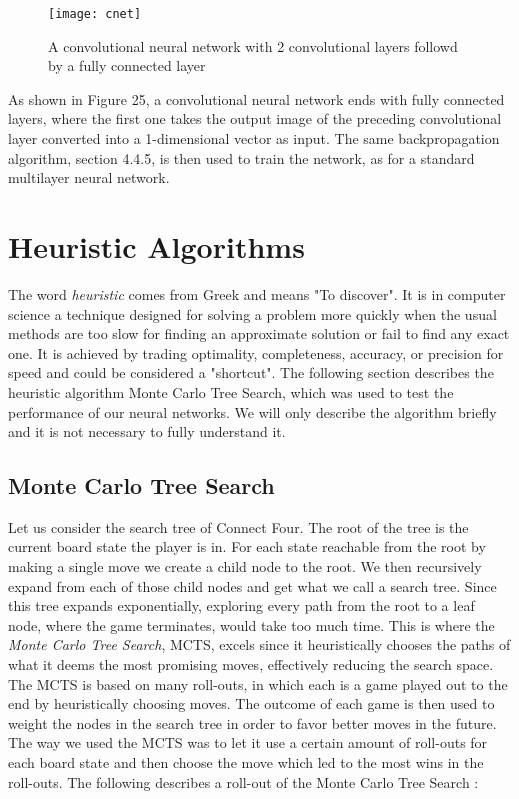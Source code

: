 \documentclass[titlepage]{article}
\begin{document}
\vskip 0.4cm

\begin{figure}[h]
    \center
    \texttt{[image: cnet]}
    \vskip 0.4cm
    \caption{A convolutional neural network with 2 convolutional layers followd by a fully connected layer}
\end{figure}

\vskip 0.2cm

\noindent
As shown in Figure 25, a convolutional neural network ends with fully connected layers, where the first one takes the output image of the preceding convolutional layer converted into a 1-dimensional vector as input. The same backpropagation algorithm, section 4.4.5, is then used to train the network, as for a standard multilayer neural network.

\newpage

\section{Heuristic Algorithms}

\vskip 0.3cm

The word \emph{heuristic} comes from Greek and means "To discover". It is in computer science a technique designed for solving a problem more quickly when the usual methods are too slow for finding an approximate solution or fail to find any exact one. It is achieved by trading optimality, completeness, accuracy, or precision for speed and could be considered a "shortcut". The following section describes the heuristic algorithm Monte Carlo Tree Search, which was used to test the performance of our neural networks. We will only describe the algorithm briefly and it is not necessary to fully understand it.

\subsection{Monte Carlo Tree Search}

\vskip 0.2cm

Let us consider the search tree of Connect Four. The root of the tree is the current board state the player is in. For each state reachable from the root by making a single move we create a child node to the root. We then recursively expand from each of those child nodes and get what we call a search tree. Since this tree expands exponentially, exploring every path from the root to a leaf node, where the game terminates, would take too much time. This is where the \emph{Monte Carlo Tree Search}, MCTS, excels since it heuristically chooses the paths of what it deems the most promising moves, effectively reducing the search space. The MCTS is based on many roll-outs, in which each is a game played out to the end by heuristically choosing moves. The outcome of each game is then used to weight the nodes in the search tree in order to favor better moves in the future. The way we used the MCTS was to let it use a certain amount of roll-outs for each board state and then choose the move which led to the most wins in the roll-outs. The following describes a roll-out of the Monte Carlo Tree Search \cite{mcts}:
\end{document}
